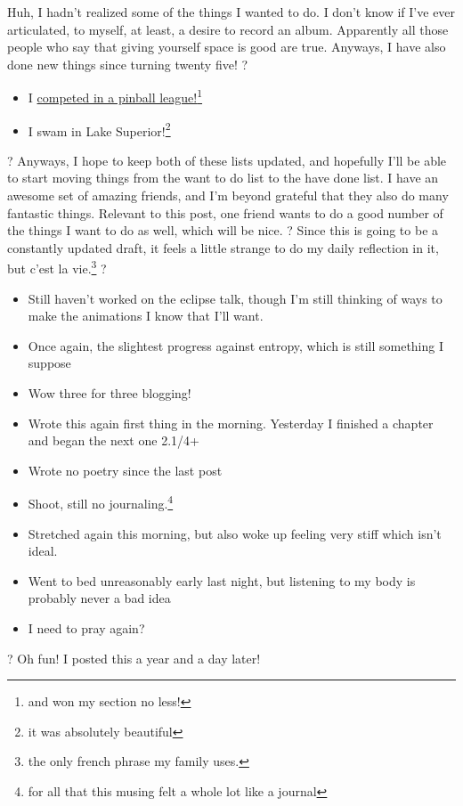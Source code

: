 \documentclass[12pt]{article}[titlepage]
\newcommand{\1}{\={a}}
\newcommand{\2}{\={e}}
\newcommand{\3}{\={\i}}
\newcommand{\4}{\=o}
\newcommand{\5}{\=u}
\newcommand{\6}{\={A}}
\renewcommand{\,}{\textsuperscript{,}}
\begin{document}
Huh, I hadn't realized some of the things I wanted to do.
I don't know if I've ever articulated, to myself, at least, a desire to record an album.
Apparently all those people who say that giving yourself space is good are true.
Anyways, I have also done new things since turning twenty five!
?
\begin{itemize}
\item I \href{pinball.html}{competed in a pinball league!}\footnote{and won my section no less!}
\item I swam in Lake Superior!\footnote{it was absolutely beautiful}
\end{itemize}
?
Anyways, I hope to keep both of these lists updated, and hopefully I'll be able to start moving things from the want to do list to the have done list.
I have an awesome set of amazing friends, and I'm beyond grateful that they also do many fantastic things.
Relevant to this post, one friend wants to do a good number of the things I want to do as well, which will be nice.
?
Since this is going to be a constantly updated draft, it feels a little strange to do my daily reflection in it, but c'est la vie.\footnote{the only french phrase my family uses.}
?
\begin{itemize}
\item Still haven't worked on the eclipse talk, though I'm still thinking of ways to make the animations I know that I'll want.
\item Once again, the slightest progress against entropy, which is still something I suppose
\item Wow three for three blogging!
\item Wrote this again first thing in the morning. Yesterday I finished a chapter and began the next one 2.1/4+
\item Wrote no poetry since the last post
\item Shoot, still no journaling.\footnote{for all that this musing felt a whole lot like a journal}
\item Stretched again this morning, but also woke up feeling very stiff which isn't ideal.
\item Went to bed unreasonably early last night, but listening to my body is probably never a bad idea
\item I need to pray again?\end{itemize}?
Oh fun! I posted this a year and a day later!
\end{document}
